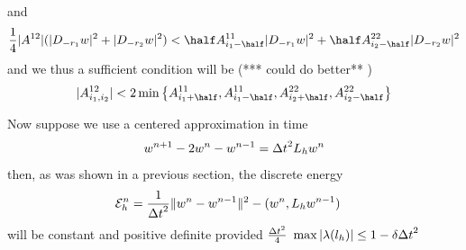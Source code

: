 \documentclass[10pt]{article}
\begin{document}
and 
\[
   {1\over 4} |A^{12}| ( |D_{- r_1}w|^2 + |D_{- r_2}w|^2 ) < 
     \half A^{11}_{i_1-\half} |D_{- r_1} w|^2 +\half A^{22}_{i_2-\half} |D_{- r_2} w|^2
\]
and we thus a sufficient condition will be (*** could do better** )
\[
   |A^{12}_{i_1,i_2}| < 2 \min  \left\{ A^{11}_{i_1+\half},A^{11}_{i_1-\half}, 
                                       A^{22}_{i_2+\half}, 
                                       A^{22}_{i_2-\half}  \right\}
\]

Now suppose we use a centered approximation in time
\[
   w^{n+1} - 2 w^{n} - w^{n-1} = {\Delta t}^2 L_h w^{n}
\]
then, as was shown in a previous section, the discrete energy 
\begin{align*}
  {\cal E}_h^n  &= {1\over {\Delta t}^2} \| w^{n}-w^{n-1}\|^2 - (w^{n},L_h w^{n-1})
\end{align*}
will be constant and positive definite provided ${{\Delta t}^2 \over4} ~\max |\lambda(l_h)| \le 1 - \delta{\Delta t}^2$
\end{document}
